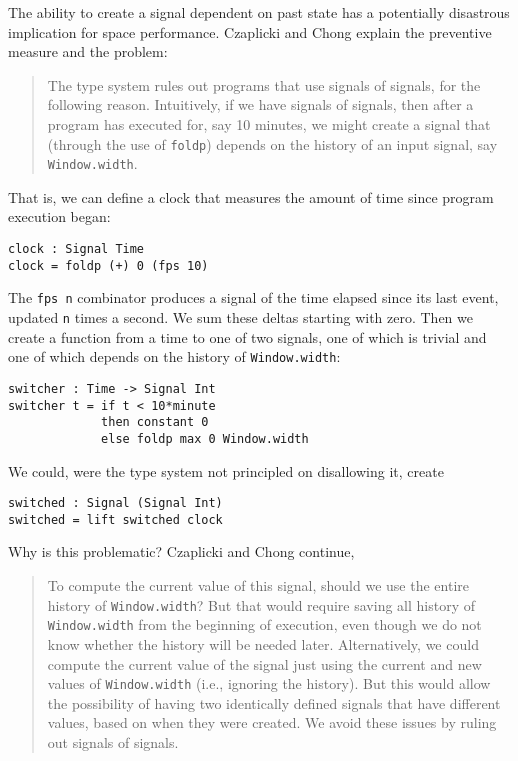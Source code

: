 \documentclass{article}
\begin{document}
The ability to create a signal dependent on past state has a potentially
disastrous implication for space performance. Czaplicki and Chong
explain the preventive measure and the problem:

\begin{quote}
The type system rules out programs that use signals of signals, for the
following reason. Intuitively, if we have signals of signals, then after
a program has executed for, say 10 minutes, we might create a signal
that (through the use of \texttt{foldp}) depends on the history of an
input signal, say \texttt{Window.width}.
\end{quote}

That is, we can define a clock that measures the amount of time since
program execution began:

\begin{verbatim}
clock : Signal Time
clock = foldp (+) 0 (fps 10)
\end{verbatim}

The \texttt{fps n} combinator produces a signal of the time elapsed
since its last event, updated \texttt{n} times a second. We sum these
deltas starting with zero. Then we create a function from a time to one
of two signals, one of which is trivial and one of which depends on the
history of \texttt{Window.width}:

\begin{verbatim}
switcher : Time -> Signal Int
switcher t = if t < 10*minute
             then constant 0
             else foldp max 0 Window.width
\end{verbatim}

We could, were the type system not principled on disallowing it, create

\begin{verbatim}
switched : Signal (Signal Int)
switched = lift switched clock
\end{verbatim}

Why is this problematic? Czaplicki and Chong continue,

\begin{quote}
To compute the current value of this signal, should we use the entire
history of \texttt{Window.width}? But that would require saving all
history of \texttt{Window.width} from the beginning of execution, even
though we do not know whether the history will be needed later.
Alternatively, we could compute the current value of the signal just
using the current and new values of \texttt{Window.width} (i.e.,
ignoring the history). But this would allow the possibility of having
two identically defined signals that have different values, based on
when they were created. We avoid these issues by ruling out signals of
signals.
\end{quote}
\end{document}
